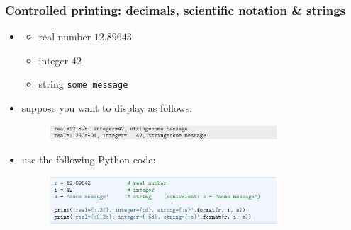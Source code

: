 \documentclass[14pt]{beamer}
\begin{document}
\begin{frame}[fragile]

\frametitle{Controlled printing: decimals, scientific notation \& strings}

\begin{itemize}
\item[] 	\begin{itemize}
		\item real number $12.89643$
		\item integer $42$
		\item string \texttt{some message}
	\end{itemize}

\item suppose you want to display as follows:
\begin{figure}[ht]
	\centering
	\includegraphics[width=0.8\textwidth]{figures/LLp29a}
\end{figure}

\item use the following Python code:
\begin{figure}[ht]
	\centering
	\includegraphics[width=0.8\textwidth]{figures/LLp29b}
\end{figure}

\end{itemize}

\end{frame}

\end{document}

